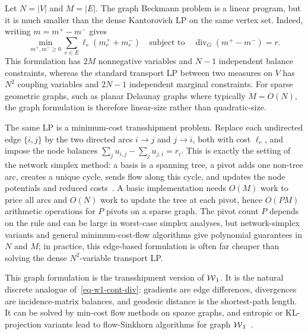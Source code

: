 \begin{rem}\label{rem-graph-w1-network-simplex}
	Let $N=|V|$ and $M=|E|$. The graph Beckmann problem is a linear program, but it is much smaller than the dense Kantorovich LP on the same vertex set. Indeed, writing $m=m^+-m^-$ gives
	\[
		\min_{m^+,m^-\geq0}\sum_{e\in E}\ell_e(m^+_e+m^-_e)
		\quad\text{subject to}\quad
		\operatorname{div}_G(m^+-m^-)=r.
	\]
	This formulation has $2M$ nonnegative variables and $N-1$ independent balance constraints, whereas the standard transport LP between two measures on $V$ has $N^2$ coupling variables and $2N-1$ independent marginal constraints. For sparse geometric graphs, such as planar Delaunay graphs where typically $M=O(N)$, the graph formulation is therefore linear-size rather than quadratic-size.

	The same LP is a minimum-cost transshipment problem. Replace each undirected edge $\{i,j\}$ by the two directed arcs $i\to j$ and $j\to i$, both with cost $\ell_e$, and impose the node balances $\sum_{j}u_{i,j}-\sum_j u_{j,i}=r_i$. This is exactly the setting of the network simplex method: a basis is a spanning tree, a pivot adds one non-tree arc, creates a unique cycle, sends flow along this cycle, and updates the node potentials and reduced costs~\cite{bertsekas1988dual,Orlin1997}. A basic implementation needs $O(M)$ work to price all arcs and $O(N)$ work to update the tree at each pivot, hence $O(PM)$ arithmetic operations for $P$ pivots on a sparse graph. The pivot count $P$ depends on the rule and can be large in worst-case simplex analyses, but network-simplex variants and general minimum-cost-flow algorithms give polynomial guarantees in $N$ and $M$; in practice, this edge-based formulation is often far cheaper than solving the dense $N^2$-variable transport LP.
\end{rem}

This graph formulation is the transshipment version of $\operatorname{\mathcal{W}}_1$. It is the natural discrete analogue of~\eqref{eq-w1-cont-div}: gradients are edge differences, divergences are incidence-matrix balances, and geodesic distance is the shortest-path length. It can be solved by min-cost flow methods on sparse graphs, and entropic or KL-projection variants lead to flow-Sinkhorn algorithms for graph $\operatorname{\mathcal{W}}_1$~\cite{Beckmann52,peyre2026robust}.

